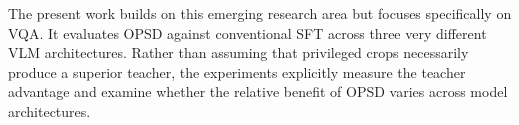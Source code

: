 The present work builds on this emerging research area but focuses specifically on VQA. It evaluates 
OPSD against conventional SFT across three very different VLM architectures. Rather than assuming
that privileged crops necessarily produce a superior teacher, the experiments explicitly measure the 
teacher advantage and examine whether the relative benefit of OPSD varies across model architectures.